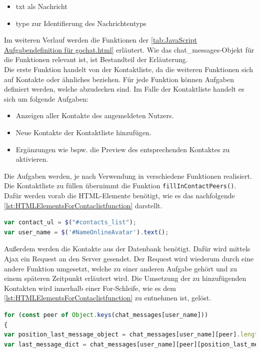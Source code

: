 \documentclass[a4paper,titlepage,halfparskip,12pt]{scrreprt}
\begin{document}
\begin{onehalfspacing}
\begin{itemize}
	\item txt als Nachricht
	\item type zur Identifierung des Nachrichtentyps
\end{itemize}
Im weiteren Verlauf werden die Funktionen der \autoref{tab:JavaScript Aufgabendefinition für gochat.html} erläutert. Wie das chat\_messages-Objekt für die Funktionen relevant ist, ist Bestandteil der Erläuterung.\\
Die erste Funktion handelt von der Kontaktliste, da die weiteren Funktionen sich auf Kontakte oder ähnliches beziehen. Für jede Funktion können Aufgaben definiert werden, welche abzudecken sind. Im Falle der Kontaktliste handelt es sich um folgende Aufgaben:
\begin{itemize}
	\item Anzeigen aller Kontakte des angemeldeten Nutzers.
	\item Neue Kontakte der Kontaktliste hinzufügen.
	\item Ergänzungen wie bspw. die Preview des entsprechenden Kontaktes zu aktivieren.
\end{itemize}
Die Aufgaben werden, je nach Verwendung in verschiedene Funktionen realisiert. Die Kontaktliste zu füllen übernimmt die Funktion \texttt{fillInContactPeers()}. Dafür werden vorab die \ac{HTML}-Elemente benötigt, wie es das nachfolgende \autoref{lst:HTMLElementsForContaclistfunction} darstellt.
\begin{lstlisting}[language=Javascript,caption=HTML Elemente für \texttt{fillInContactPeers()},label={lst:HTMLElementsForContaclistfunction}]
var contact_ul = $("#contacts_list");
var user_name = $('#NameOnlineAvatar').text();
\end{lstlisting}
Außerdem werden die Kontakte aus der Datenbank benötigt. Dafür wird mittels Ajax ein Request an den Server gesendet. Der Request wird wiederum durch eine andere Funktion umgesetzt, welche zu einer anderen Aufgabe gehört und zu einem späteren Zeitpunkt erläutert wird. Die Umsetzung der zu hinzufügenden Kontakten wird innerhalb einer For-Schleife, wie es dem \autoref{lst:HTMLElementsForContaclistfunction} zu entnehmen ist, gelöst.
\begin{lstlisting}[language=Javascript,caption=HTML Elemente für \texttt{fillInContactPeers()},label={lst:HTMLElementsForContaclistfunction}]
for (const peer of Object.keys(chat_messages[user_name]))
{
var position_last_message_object = chat_messages[user_name][peer].length - 1;
var last_message_dict = chat_messages[user_name][peer][position_last_message_object];

\end{lstlisting}
\end{onehalfspacing}
\end{document}
